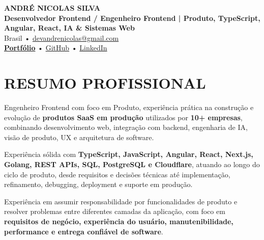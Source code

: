 \documentclass[10pt,a4paper]{article}
\begin{document}

\begin{center}

    {\LARGE \textbf{ANDRÉ NICOLAS SILVA}} \\[-2pt]

    {\normalsize \textbf{Desenvolvedor Frontend / Engenheiro Frontend | Produto, TypeScript, Angular, React, IA \& Sistemas Web}} \\[1pt]

    \footnotesize
    Brasil \quad • \quad
    \href{mailto:devandrenicolas@gmail.com}{devandrenicolas@gmail.com} \\[-1pt]

    \textbf{\href{https://portfolio-andrenicolas.vercel.app}{Portfólio}}
    \quad • \quad
    \href{https://github.com/devAndreNicolas}{GitHub}
    \quad • \quad
    \href{https://www.linkedin.com/in/devandrenicolas}{LinkedIn}

\end{center}

\vspace{-3pt}


\section*{RESUMO PROFISSIONAL}

\footnotesize

Engenheiro Frontend com foco em Produto, experiência prática na construção e
evolução de \textbf{produtos SaaS em produção} utilizados por
\textbf{10+ empresas}, combinando desenvolvimento web, integração com
backend, engenharia de IA, visão de produto, UX e arquitetura de software.

Experiência sólida com \textbf{TypeScript, JavaScript, Angular, React,
Next.js, Golang, REST APIs, SQL, PostgreSQL e Cloudflare}, atuando ao
longo do ciclo de produto, desde requisitos e decisões técnicas até
implementação, refinamento, debugging, deployment e suporte em produção.

Experiência em assumir responsabilidade por funcionalidades de produto
e resolver problemas entre diferentes camadas da aplicação, com foco em
\textbf{requisitos de negócio, experiência do usuário, manutenibilidade,
performance e entrega confiável de software}.
\end{document}
